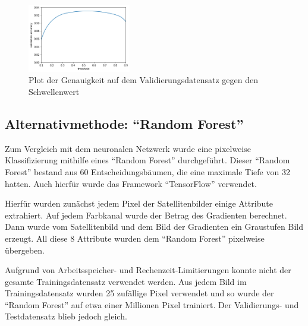 \begin{figure}
    \centering
    \includegraphics[width=0.4\textwidth]{images/threshold.png}
    \caption{Plot der Genauigkeit auf dem Validierungsdatensatz gegen den Schwellenwert}
    \label{fig:threshold}
\end{figure}

\subsection{Alternativmethode: \enquote{Random Forest}}
\label{ssec:Alternativmethode}

Zum Vergleich mit dem neuronalen Netzwerk wurde eine pixelweise Klassifizierung mithilfe eines \enquote{Random Forest} durchgeführt.
Dieser \enquote{Random Forest} bestand aus 60 Entscheidungsbäumen, die eine maximale Tiefe von 32 hatten.
Auch hierfür wurde das Framework \enquote{TensorFlow} verwendet.\cite{tfdf}

Hierfür wurden zunächst jedem Pixel der Satellitenbilder einige Attribute extrahiert.
Auf jedem Farbkanal wurde der Betrag des Gradienten berechnet.
Dann wurde vom Satellitenbild und dem Bild der Gradienten ein Graustufen Bild erzeugt.
All diese 8 Attribute wurden dem \enquote{Random Forest} pixelweise übergeben.

Aufgrund von Arbeitsspeicher- und Rechenzeit-Limitierungen konnte nicht der gesamte Trainingsdatensatz verwendet werden.
Aus jedem Bild im Trainingsdatensatz wurden 25 zufällige Pixel verwendet und so wurde der \enquote{Random Forest} auf etwa einer Millionen Pixel trainiert.
Der Validierungs- und Testdatensatz blieb jedoch gleich.
